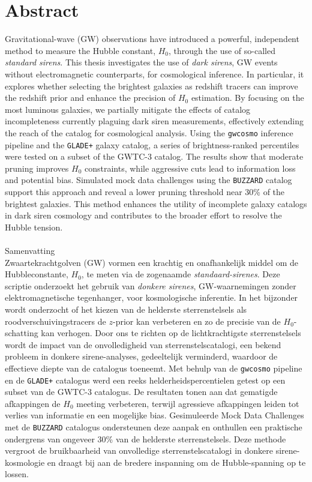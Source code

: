 %
\chapter*{Abstract}
\label{sec:abstract}
\vspace*{-10mm}
Gravitational-wave (GW) observations have introduced a powerful, independent method to measure the Hubble constant, $H_0$, through the use of so-called \textit{standard sirens}. This thesis investigates the use of \textit{dark sirens}, GW events without electromagnetic counterparts, for cosmological inference. In particular, it explores whether selecting the brightest galaxies as redshift tracers can improve the redshift prior and enhance the precision of $H_0$ estimation. By focusing on the most luminous galaxies, we partially mitigate the effects of catalog incompleteness currently plaguing dark siren measurements, effectively extending the reach of the catalog for cosmological analysis. Using the \texttt{gwcosmo} inference pipeline and the \texttt{GLADE+} galaxy catalog, a series of brightness-ranked percentiles were tested on a subset of the GWTC-3 catalog. The results show that moderate pruning improves $H_0$ constraints, while aggressive cuts lead to information loss and potential bias. Simulated mock data challenges using the \texttt{BUZZARD} catalog support this approach and reveal a lower pruning threshold near 30\% of the brightest galaxies. This method enhances the utility of incomplete galaxy catalogs in dark siren cosmology and contributes to the broader effort to resolve the Hubble tension.\\
\\

{ Samenvatting}\label{sec:abstract-nl}\\

Zwaartekrachtgolven (GW) vormen een krachtig en onafhankelijk middel om de Hubbleconstante, $H_0$, te meten via de zogenaamde \textit{standaard-sirenes}. Deze scriptie onderzoekt het gebruik van \textit{donkere sirenes}, GW-waarnemingen zonder elektromagnetische tegenhanger, voor kosmologische inferentie. In het bijzonder wordt onderzocht of het kiezen van de helderste sterrenstelsels als roodverschuivingstracers de $z$-prior kan verbeteren en zo de precisie van de $H_0$-schatting kan verhogen. Door ons te richten op de lichtkrachtigste sterrenstelsels wordt de impact van de onvolledigheid van sterrenstelscatalogi, een bekend probleem in donkere sirene-analyses, gedeeltelijk verminderd, waardoor de effectieve diepte van de catalogus toeneemt. Met behulp van de \texttt{gwcosmo} pipeline en de \texttt{GLADE+} catalogus werd een reeks helderheidspercentielen getest op een subset van de GWTC-3 catalogus. De resultaten tonen aan dat gematigde afkappingen de $H_0$ meeting verbeteren, terwijl agressieve afkappingen leiden tot verlies van informatie en een mogelijke bias. Gesimuleerde Mock Data Challenges met de \texttt{BUZZARD} catalogus ondersteunen deze aanpak en onthullen een praktische ondergrens van ongeveer 30\% van de helderste sterrenstelsels. Deze methode vergroot de bruikbaarheid van onvolledige sterrenstelscatalogi in donkere sirene-kosmologie en draagt bij aan de bredere inspanning om de Hubble-spanning op te lossen.